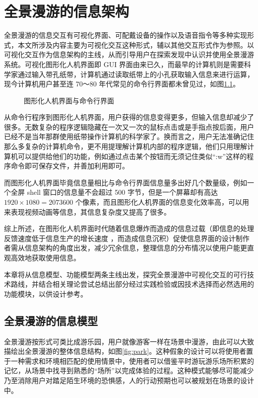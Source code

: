 \chapter{全景漫游的信息架构}

全景漫游的信息交互有可视化界面、可配戴设备的操作以及语音指令等多种实现形式，本文所涉及内容主要为可视化交互这种形式，辅以其他交互形式作为参照。以可视化交互作为信息架构的主线，从而引导用户在探索发现中认识并使用全景漫游系统。可视化图形化人机界面即 GUI 界面由来已久，而最早的计算机则是需要科学家通过输入带孔纸带，计算机通过读取纸带上的小孔获取输入信息来进行运算，现今计算机用户甚至连 70～80 年代常见的命令行界面都未曾见过，如图\ref{fig:gui&cli}。

\begin{figure}[htp]
\centering
{}
\caption{图形化人机界面与命令行界面}
\label{fig:gui&cli}
\end{figure}

从命令行程序到图形化人机界面，用户获得的信息变得更多，但输入信息却减少了很多。无数复杂的程序逻辑隐藏在一次又一次的鼠标点击或是手指点按后面，用户已经不是当年那群使用纸带操作计算机的科学家了。换而言之，用户无法准确记住那么多复杂的计算机命令，更不用提理解计算机内部的程序逻辑，他们只用理解计算机可以提供给他们的功能，例如通过点击某个按钮而无须记住类似“:w”这样的程序命令即可保存文件，并善加利用即可。

而图形化人机界面毕竟信息量相比与命令行界面信息量多出好几个数量级，例如一个全屏 shell 窗口的信息量不会超过 500 字节，但是一个屏幕却有高达 $1920\times1080=2073600$ 个像素，而且图形化人机界面的信息变化效率高，可以用来表现视频动画等信息，其信息复杂度又提高了很多。

综上所述，在图形化人机界面时代随着信息爆炸而造成的信息过载（即信息的处理反馈速度低于信息生产的增长速度
，而造成信息沉积）促使信息界面的设计制作者需从信息架构的角度出发，减少冗余信息，整理信息的分布情况以使用户能更直观高效地获取使用信息。

本章将从信息模型、功能模型两条主线出发，探究全景漫游中可视化交互的可行技术路线，并结合相关理论尝试总结出部分经过实践检验或因技术选择而必然选用的功能模块，以供设计参考。


\section{全景漫游的信息模型}

全景漫游按形式可类比成游乐园，用户就像游客一样在场景中漫游，由此可以大致描绘出全景漫游的整体信息结构，如图\ref{fig:park}。这种假象的设计可以将使用者置于一种需求和环境相匹配的使用情景中，使用者可以借鉴平时游玩游乐场所积累的记忆，从场景中找寻到熟悉的“场所”以完成体验的过程。这种模式能够尽可能减少乃至消除用户对踏足陌生环境的恐惧感，人的行动预期也可以被规划在场景的设计中。

